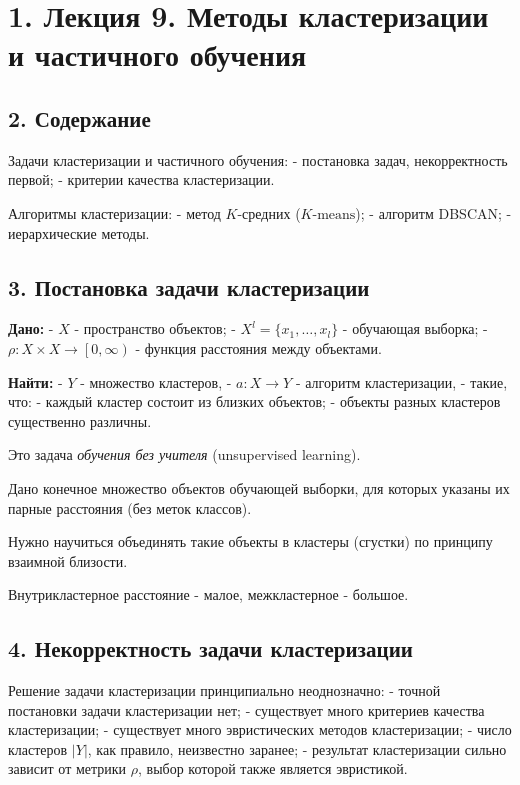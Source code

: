 \section{1. Лекция 9. Методы кластеризации и частичного обучения}

\subsection{2. Содержание}

Задачи кластеризации и частичного обучения:
- постановка задач, некорректность первой;
- критерии качества кластеризации.

Алгоритмы кластеризации:
- метод $K$-средних ($\textit{K} \text{-means}$);
- алгоритм DBSCAN;
- иерархические методы.

\subsection{3. Постановка задачи кластеризации}

\textbf{Дано:}
- $X$ - пространство объектов;
- $X^l = {\lbrace x_1, \ldots, x_l \rbrace}$ - обучающая выборка;
- $\rho \! : X \times X \rightarrow {\left[ 0, \infty \right)}$ - функция расстояния между объектами.

\textbf{Найти:}
- $Y$ - множество кластеров,
- $a \! : X \rightarrow Y$ - алгоритм кластеризации,
- такие, что:
    - каждый кластер состоит из близких объектов;
    - объекты разных кластеров существенно различны.

Это задача \textit{обучения без учителя} (unsupervised learning).

Дано конечное множество объектов обучающей выборки, для которых указаны
их парные расстояния (без меток классов).

Нужно научиться объединять такие объекты в кластеры (сгустки) по принципу
взаимной близости.

Внутрикластерное расстояние - малое, межкластерное - большое.

\subsection{4. Некорректность задачи кластеризации}

Решение задачи кластеризации принципиально неоднозначно:
- точной постановки задачи кластеризации нет;
- существует много критериев качества кластеризации;
- существует много эвристических методов кластеризации;
- число кластеров $\vert Y \vert$, как правило, неизвестно заранее;
- результат кластеризации сильно зависит от метрики $\rho$, выбор которой
также является эвристикой.


